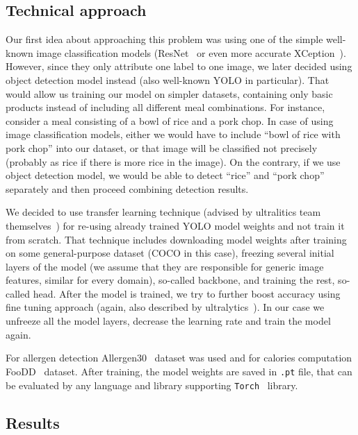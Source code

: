 \documentclass[10pt,twocolumn,letterpaper]{article}
\begin{document}

\subsection{Technical approach}

Our first idea about approaching this problem was using one of the simple well-known image classification models (ResNet~\cite{he2015deepresiduallearningimage} or even more accurate XCeption~\cite{chollet2017xceptiondeeplearningdepthwise}).
However, since they only attribute one label to one image, we later decided using object detection model instead (also well-known YOLO in particular).
That would allow us training our model on simpler datasets, containing only basic products instead of including all different meal combinations.
For instance, consider a meal consisting of a bowl of rice and a pork chop.
In case of using image classification models, either we would have to include ``bowl of rice with pork chop'' into our dataset, or that image will be classified not precisely (probably as rice if there is more rice in the image).
On the contrary, if we use object detection model, we would be able to detect ``rice'' and ``pork chop'' separately and then proceed combining detection results.

We decided to use transfer learning technique (advised by ultralitics team themselves~\cite{ultralytics2024transferlearning}) for re-using already trained YOLO model weights and not train it from scratch.
That technique includes downloading model weights after training on some general-purpose dataset (COCO in this case), freezing several initial layers of the model (we assume that they are responsible for generic image features, similar for every domain), so-called backbone, and training the rest, so-called head.
After the model is trained, we try to further boost accuracy using fine tuning approach (again, also described by ultralytics~\cite{ultralytics2024finetuning}).
In our case we unfreeze all the model layers, decrease the learning rate and train the model again.

For allergen detection Allergen30~\cite{mishra2022allergen30} dataset was used and for calories computation FooDD~\cite{yvk7qk3820} dataset.
After training, the model weights are saved in \texttt{.pt} file, that can be evaluated by any language and library supporting \texttt{Torch}~\cite{torchlibrary} library.

\subsection{Results}
\end{document}
